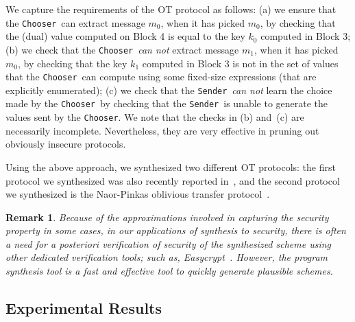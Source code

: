 \documentclass[preprint]{sig-alternate-05-2015}
\newtheorem{remark}{Remark}
\def\sender{{\tt{Sender}}}
\def\chooser{{\tt{Chooser}}}
\begin{document}
We capture the requirements of the OT protocol as follows:
(a) we ensure that the \chooser\ can extract message $m_0$, when it has picked $m_0$,
by checking that the (dual) value computed on Block 4 is equal to the key $k_0$
computed in Block 3;
(b) we check that the \chooser\ {\em{can not}} extract message $m_1$, when it has picked $m_0$,
by checking that the key $k_1$ computed in Block 3 is not in the set of values that the
\chooser\ can compute using some fixed-size expressions (that are explicitly enumerated);
(c) we check that the \sender\ {\em{can not}} learn the choice made by the \chooser\ by
checking that the \sender\ is unable to generate the values sent by the \chooser.
We note that the checks in (b) and~(c) are necessarily incomplete. Nevertheless, they are
very effective in pruning out obviously insecure protocols.

Using the above approach, we synthesized two different OT protocols:
the first protocol we synthesized was also recently reported in~\cite{SimpleOT},
and the second protocol we synthesized is the Naor-Pinkas oblivious transfer protocol~\cite{Pinkas}.

\begin{remark}
Because of the approximations involved in capturing the security
property in some cases, in our applications of synthesis to security, 
there is often a need for {\em{a posteriori}} verification of security 
of the synthesized scheme using other dedicated verification tools; 
such as, Easycrypt~\cite{easycrypt}. 
However, the program synthesis tool is a fast and effective tool to 
quickly generate plausible schemes.
\end{remark}



\subsection{Experimental Results}
\end{document}
